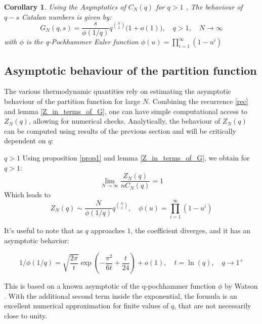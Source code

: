 \documentclass[pdflatex,sn-mathphys-num]{sn-jnl}
\newtheorem{corollary}[theorem]{Corollary}
\theoremstyle{definition}
\theoremstyle{remark}
\numberwithin{equation}{section}
\begin{document}
\begin{corollary}
Using the Asymptotics of $C_N(q)$ for $q>1$ \cite{furlinger1985q, flajolet2009analytic},
The behaviour of  $q\!-\!s$  Catalan numbers  is given by:
    \begin{equation}
G_{N}(q,s)=\frac{s}{\phi(1/q)} q^{\binom{N}{2}} \bigl(1+o(1)\bigr),\quad q > 1, \quad N\to\infty
\end{equation}
with $\phi$ is the 
q-Pochhammer Euler function
$\phi(u) = \prod_{i=1}^{\infty} (1 - u^i)$
\label{cor1}
\end{corollary}




\subsection{Asymptotic behaviour of the partition function}
The various thermodynamic quantities rely on estimating the asymptotic behaviour of the partition function for large $N$. Combining the recurrence \ref{rec} and lemma \ref{Z_in_terms_of_G}, one can have simple computational access to $Z_N(q)$, allowing for numerical checks. Analytically, the behaviour of $Z_N(q)$ can be computed using results of the previous section and will be critically dependent on $q$:

\noindent
$\boxed{q > 1}$ Using proposition \ref{prop1} and lemma \ref{Z_in_terms_of_G}, we obtain for $q>1$:
\begin{equation}
    \lim_{N \rightarrow \infty} \frac{Z_N(q)}{n C_N(q)} = 1
\end{equation}
Which leads to 
\begin{equation}
    Z_N(q) \sim \frac{N}{\phi(1/q)}
    q^{\binom{N}{2}}, 
    \quad
    \phi(u)= \prod_{i=1}^{\infty} (1-u^{i})
    \label{asympZN}
\end{equation}




It's useful to note that as $q$ approaches $1$, the coefficient diverges, and it has an asymptotic behavior:


\begin{equation}
    1/\phi(1/q) = \sqrt{\frac{2\pi}{t}} \exp\left(-\frac{\pi^2}{6 t} + \frac{t}{24}\right) + o(1), \quad t = \ln(q), \quad q \rightarrow 1^+
     \label{asympEuler}
\end{equation}

This is based on a known asymptotic of the q-pochhammer function $\phi$ by Watson \cite{watson1936final}. With the additional second term inside the exponential, the formula is an excellent numerical approximation for finite values of $q$, that are not necessarily close to unity.
\end{document}
